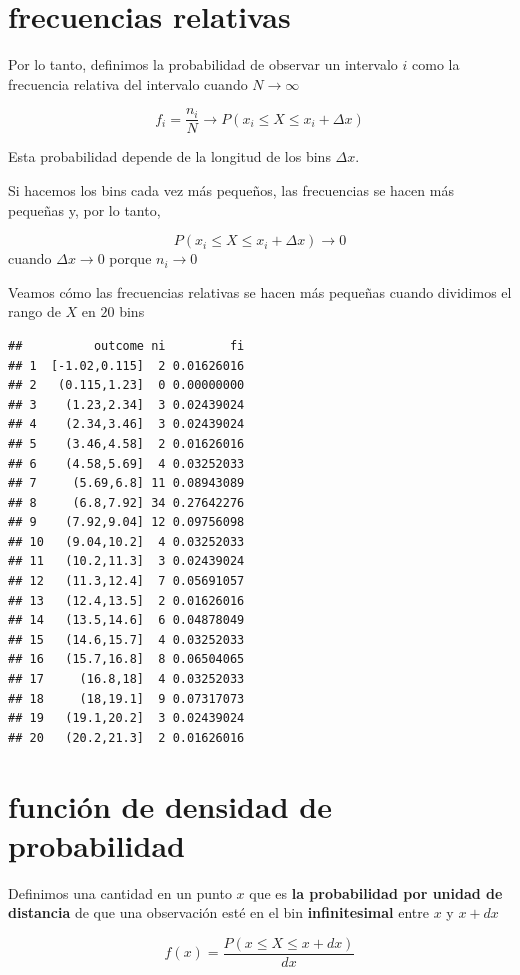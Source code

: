 \documentclass[
]{book}
\begin{document}
\hypertarget{frecuencias-relativas-3}{%
\section{frecuencias relativas}\label{frecuencias-relativas-3}}

Por lo tanto, definimos la probabilidad de observar un intervalo \(i\) como la frecuencia relativa del intervalo cuando \(N \rightarrow \infty\)

\[ f_i =\frac{ n_ i }{ N} \rightarrow P( x_i \leq X \leq x_i + \Delta x)\]

Esta probabilidad depende de la longitud de los bins \(\Delta x\).

Si hacemos los bins cada vez más pequeños, las frecuencias se hacen más pequeñas y, por lo tanto,

\[P(x_i \leq X \leq x_i + \Delta x) \rightarrow 0\] cuando \(\Delta x \rightarrow 0\) porque \(n_i \rightarrow 0\)

Veamos cómo las frecuencias relativas se hacen más pequeñas cuando dividimos el rango de \(X\) en \(20\) bins

\begin{verbatim}
##          outcome ni         fi
## 1  [-1.02,0.115]  2 0.01626016
## 2   (0.115,1.23]  0 0.00000000
## 3    (1.23,2.34]  3 0.02439024
## 4    (2.34,3.46]  3 0.02439024
## 5    (3.46,4.58]  2 0.01626016
## 6    (4.58,5.69]  4 0.03252033
## 7     (5.69,6.8] 11 0.08943089
## 8     (6.8,7.92] 34 0.27642276
## 9    (7.92,9.04] 12 0.09756098
## 10   (9.04,10.2]  4 0.03252033
## 11   (10.2,11.3]  3 0.02439024
## 12   (11.3,12.4]  7 0.05691057
## 13   (12.4,13.5]  2 0.01626016
## 14   (13.5,14.6]  6 0.04878049
## 15   (14.6,15.7]  4 0.03252033
## 16   (15.7,16.8]  8 0.06504065
## 17     (16.8,18]  4 0.03252033
## 18     (18,19.1]  9 0.07317073
## 19   (19.1,20.2]  3 0.02439024
## 20   (20.2,21.3]  2 0.01626016
\end{verbatim}

\hypertarget{funciuxf3n-de-densidad-de-probabilidad}{%
\section{función de densidad de probabilidad}\label{funciuxf3n-de-densidad-de-probabilidad}}

Definimos una cantidad en un punto \(x\) que es \textbf{la probabilidad por unidad de distancia} de que una observación esté en el bin \textbf{infinitesimal} entre \(x\) y \(x+dx\)

\[f(x)= \frac{ P(x\leq X \leq x+dx )}{dx}\]
\end{document}
